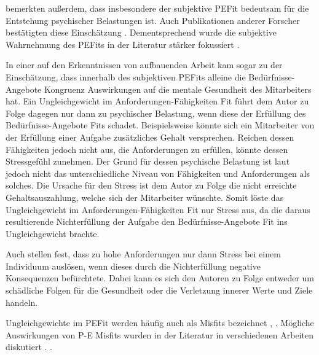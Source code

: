 \textcite[S. 4]{copingAndAdaption:1974} bemerkten außerdem, dass insbesondere der subjektive \ac{PEFit} bedeutsam für die Entstehung psychischer Belastungen ist. Auch Publikationen anderer Forscher bestätigten diese Einschätzung \cite[S. 3]{carless:2005}. Dementsprechend wurde die subjektive Wahrnehmung des \acp{PEFit} in der Literatur stärker fokussiert \cite[S. 8]{caplan:1987}\cite[S. 9]{caplan:1993}\cite[S. 16]{choi:2004}.

In einer auf den Erkenntnissen von \textcite[S. 1ff.]{copingAndAdaption:1974} aufbauenden Arbeit kam \textcite[S. 5ff.]{harrison:1978} sogar zu der Einschätzung, dass innerhalb des subjektiven \acp{PEFit} alleine die Bedürfnisse-Angebote Kongruenz Auswirkungen auf die mentale Gesundheit des Mitarbeiters hat. Ein Ungleichgewicht im Anforderungen-Fähigkeiten Fit führt dem Autor zu Folge dagegen nur dann zu psychischer Belastung, wenn diese der Erfüllung des Bedürfnisse-Angebote Fits schadet. Beispielsweise könnte sich ein Mitarbeiter von der Erfüllung einer Aufgabe zusätzliches Gehalt versprechen. Reichen dessen Fähigkeiten jedoch nicht aus, die Anforderungen zu erfüllen, könnte dessen Stressgefühl zunehmen. Der Grund für dessen psychische Belastung ist laut \textcite[S. 13]{harrison:1978} jedoch nicht das unterschiedliche Niveau von Fähigkeiten und Anforderungen als solches. Die Ursache für den Stress ist dem Autor zu Folge die nicht erreichte Gehaltsauszahlung, welche sich der Mitarbeiter wünschte. Somit löste das Ungleichgewicht im Anforderungen-Fähigkeiten Fit nur Stress aus, da die daraus resultierende Nichterfüllung der Aufgabe den Bedürfnisse-Angebote Fit ins Ungleichgewicht brachte.

Auch \textcite[S. 1ff.]{lazarus:1978} stellen fest, dass zu hohe Anforderungen nur dann Stress bei einem Individuum auslösen, wenn dieses durch die Nichterfüllung negative Konsequenzen befürchtete. Dabei kann es sich den Autoren zu Folge entweder um schädliche Folgen für die Gesundheit oder die Verletzung innerer Werte und Ziele handeln.

Ungleichgewichte im \ac{PEFit} werden häufig auch als Misfits bezeichnet \cite[S. 2]{edwards:2004}, \cite[S. 4]{kristof:1996}. Mögliche Auswirkungen von P-E Misfits wurden in der Literatur in verschiedenen Arbeiten diskutiert \cite{mechanismsOfJobStressAndStrain:1982}\cite{caplan:1987}. \textcite{harrison:1978}\cite{edwards:1993}.

